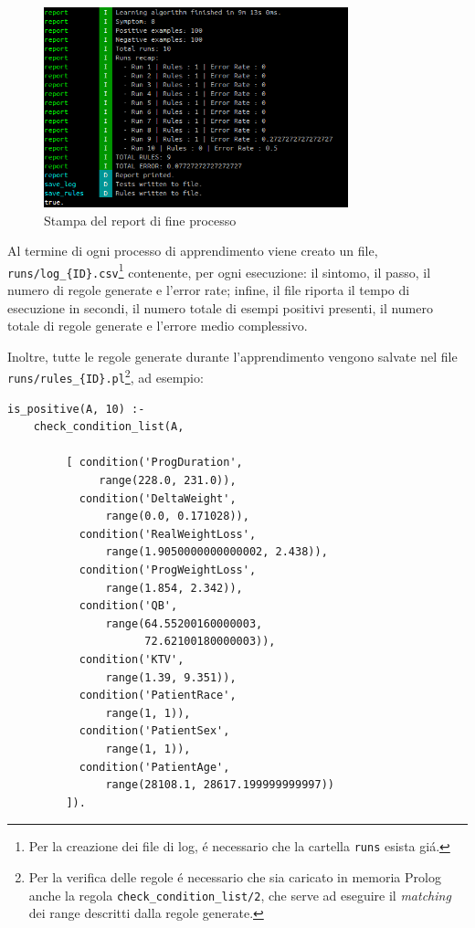 \documentclass[preprint]{acm_proc_article-sp}
\begin{document}
\begin{figure}[!htb]
\centering
\includegraphics[width=250pt]{figures/prolog-report.png}
\caption{Stampa del report di fine processo}
\label{fig:prolog-report}
\end{figure}

Al termine di ogni processo di apprendimento viene creato un file, \verb|runs/log_{ID}.csv|\footnote{Per la creazione dei file di log, \'e necessario che la cartella \verb|runs| esista gi\'a.} contenente, per ogni esecuzione: il sintomo, il passo, il numero di regole generate e l'error rate; infine, il file riporta il tempo di esecuzione in secondi, il numero totale di esempi positivi presenti, il numero totale di regole generate e l'errore medio complessivo.

Inoltre, tutte le regole generate durante l'apprendimento vengono salvate nel file \verb|runs/rules_{ID}.pl|\footnote{Per la verifica delle regole \'e necessario che sia caricato in memoria Prolog anche la regola \verb|check_condition_list/2|, che serve ad eseguire il \textit{matching} dei range descritti dalla regole generate.}, ad esempio:
\begin{verbatim}
is_positive(A, 10) :-
	check_condition_list(A,
	     
	     [ condition('ProgDuration',
	          range(228.0, 231.0)),
	       condition('DeltaWeight',
	           range(0.0, 0.171028)),
	       condition('RealWeightLoss',
	           range(1.9050000000000002, 2.438)),
	       condition('ProgWeightLoss',
	           range(1.854, 2.342)),
	       condition('QB',
	           range(64.55200160000003,
	                 72.62100180000003)),
	       condition('KTV',
	           range(1.39, 9.351)),
	       condition('PatientRace',
	           range(1, 1)),
	       condition('PatientSex',
	           range(1, 1)),
	       condition('PatientAge',
	           range(28108.1, 28617.199999999997))
	     ]).
\end{verbatim}
\end{document}
